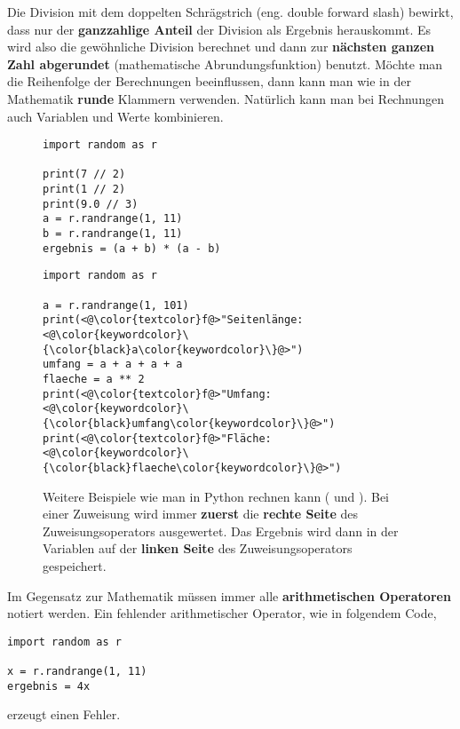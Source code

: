 Die Division mit dem doppelten Schrägstrich (eng. double forward slash) bewirkt, dass nur der \textbf{ganzzahlige Anteil} der Division als Ergebnis herauskommt. Es wird also die gewöhnliche Division berechnet und dann zur \textbf{nächsten ganzen Zahl abgerundet} (mathematische Abrundungsfunktion) benutzt. Möchte man die Reihenfolge der Berechnungen beeinflussen, dann kann man wie in der Mathematik \textbf{runde} Klammern verwenden. Natürlich kann man bei Rechnungen auch Variablen und Werte kombinieren.

\begin{figure}[htb]
\centering
\begin{minipage}{0.5\textwidth}
\centering
\begin{lstlisting}
import random as r

print(7 // 2)
print(1 // 2)
print(9.0 // 3)
a = r.randrange(1, 11)
b = r.randrange(1, 11)
ergebnis = (a + b) * (a - b)
\end{lstlisting}
\end{minipage}
\hfill
\begin{minipage}{0.45\textwidth}
\centering
\begin{lstlisting}
import random as r

a = r.randrange(1, 101)
print(<@\color{textcolor}f@>"Seitenlänge: <@\color{keywordcolor}\{\color{black}a\color{keywordcolor}\}@>")
umfang = a + a + a + a
flaeche = a ** 2
print(<@\color{textcolor}f@>"Umfang: <@\color{keywordcolor}\{\color{black}umfang\color{keywordcolor}\}@>")
print(<@\color{textcolor}f@>"Fläche: <@\color{keywordcolor}\{\color{black}flaeche\color{keywordcolor}\}@>")\end{lstlisting}
\end{minipage}
\caption{Weitere Beispiele wie man in Python rechnen kann ( und ). Bei einer Zuweisung wird immer \textbf{zuerst} die \textbf{rechte Seite} des Zuweisungsoperators ausgewertet. Das Ergebnis wird dann in der Variablen auf der \textbf{linken Seite} des Zuweisungsoperators gespeichert.}
\label{lst-calc-print-2}
\end{figure}

\begin{important}
	Im Gegensatz zur Mathematik müssen immer alle \textbf{arithmetischen Operatoren} notiert werden. Ein fehlender arithmetischer Operator, wie in folgendem Code,
	
\begin{lstlisting}
import random as r
		
x = r.randrange(1, 11)
ergebnis = 4x
\end{lstlisting}

erzeugt einen Fehler.

\end{important}

